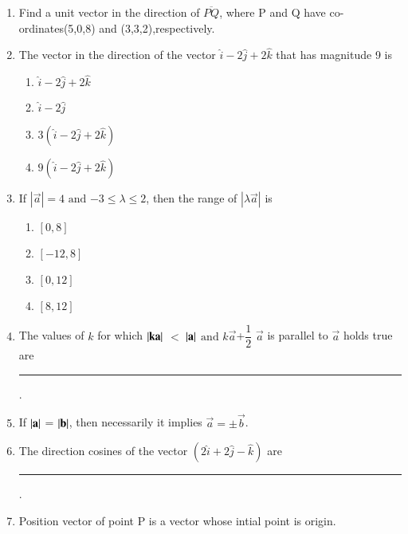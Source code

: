 \begin{enumerate}[label=\thesubsection.\arabic*,ref=\thesubsection.\theenumi]
\item Find a unit vector in the direction of $\overline{PQ} $, where P and Q have co-ordinates(5,0,8) and (3,3,2),respectively.
\item The vector in the direction of the vector $\hat{i}-2\hat{j}+2\hat{k}$ that has magnitude 9 is
	\begin{enumerate}
\item $\hat{i}-2\hat{j}+2\hat{k}$
\item $\hat{i}-2\hat{j}$
\item $3(\hat{i}-2\hat{j}+2\hat{k})$
\item $9(\hat{i}-2\hat{j}+2\hat{k})$
\end{enumerate}
\item If $|\vec{a}|=4$ $\text{and}$  $-3\leq\lambda\leq2$, then the range of $|\lambda\vec{a}|$ is
	\begin{enumerate}
\item $\left[0,8\right]$
\item $\left[-12,8\right]$
\item $\left[0,12\right]$	
\item $\left[8,12\right]$
\end{enumerate}
\item The values of $k$ for which $\left\vert\mathbf{ka}\right\vert$ $<$ $\left\vert\mathbf{a}\right\vert$ $\text{and}$ $k\vec{a}$+$\dfrac{1}{2}$ $\vec{a}$ is parallel to $\vec{a}$ holds true are \rule{1cm}{0.15mm}.
\item If $\left\vert\mathbf{a}\right\vert$ = $\left\vert\mathbf{b}\right\vert$, then necessarily it implies $\vec{a}=\pm\vec{b}$.

\item The direction cosines of the vector $(2\hat{i}+2\hat{j}-\hat{k})$ are \noindent\rule{2cm}{0.4pt}.

\item Position vector of point P is a vector whose intial point is origin.

\end{enumerate}

